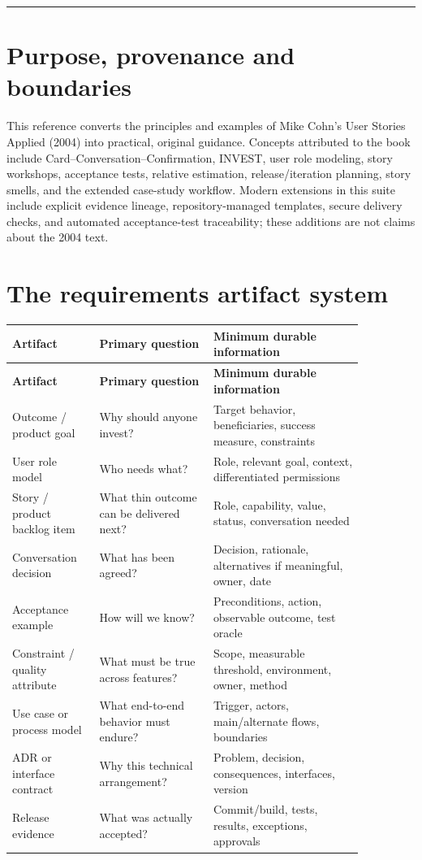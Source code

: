 \documentclass[11pt,letterpaper]{article}
\begin{document}
\tableofcontents\medskip\noindent\rule{\linewidth}{0.4pt}\medskip
\section{Purpose, provenance and boundaries}
This reference converts the principles and examples of Mike Cohn’s User Stories Applied (2004) into practical, original guidance. Concepts attributed to the book include Card–Conversation–Confirmation, INVEST, user role modeling, story workshops, acceptance tests, relative estimation, release/iteration planning, story smells, and the extended case-study workflow. Modern extensions in this suite include explicit evidence lineage, repository-managed templates, secure delivery checks, and automated acceptance-test traceability; these additions are not claims about the 2004 text.

\section{The requirements artifact system}
\begin{longtable}{|p{0.20\linewidth}|p{0.29\linewidth}|p{0.37\linewidth}|}\hline
\textbf{Artifact} & \textbf{Primary question} & \textbf{Minimum durable information} \\ \hline\endfirsthead\hline
\textbf{Artifact} & \textbf{Primary question} & \textbf{Minimum durable information} \\ \hline\endhead
Outcome / product goal & Why should anyone invest? & Target behavior, beneficiaries, success measure, constraints \\ \hline
User role model & Who needs what? & Role, relevant goal, context, differentiated permissions \\ \hline
Story / product backlog item & What thin outcome can be delivered next? & Role, capability, value, status, conversation needed \\ \hline
Conversation decision & What has been agreed? & Decision, rationale, alternatives if meaningful, owner, date \\ \hline
Acceptance example & How will we know? & Preconditions, action, observable outcome, test oracle \\ \hline
Constraint / quality attribute & What must be true across features? & Scope, measurable threshold, environment, owner, method \\ \hline
Use case or process model & What end-to-end behavior must endure? & Trigger, actors, main/alternate flows, boundaries \\ \hline
ADR or interface contract & Why this technical arrangement? & Problem, decision, consequences, interfaces, version \\ \hline
Release evidence & What was actually accepted? & Commit/build, tests, results, exceptions, approvals \\ \hline
\end{longtable}
\end{document}
